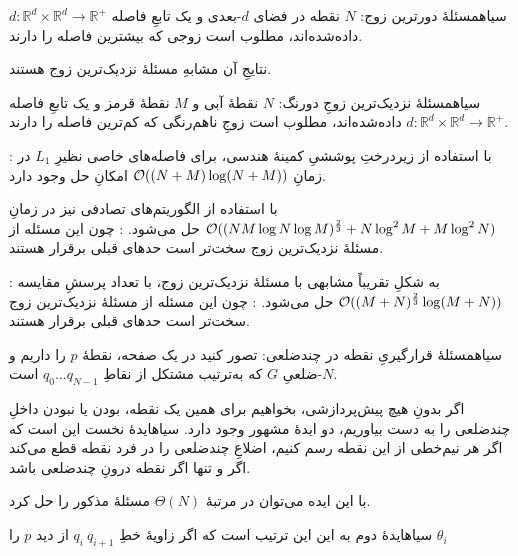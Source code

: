     ‌سیاه{مسئلهٔ دورترین زوج}: 
    \(N\)
    نقطه در فضای \(d\)-بعدی و یک تابعِ فاصله 
    \(d: \mathbb{R}^d \times \mathbb{R}^d \to \mathbb{R}^+\)
    داده‌شده‌اند، مطلوب است زوجی که بیشترین فاصله را دارند.
     
    نتایجِ آن مشابهِ مسئلهٔ نزدیک‌ترین زوج هستند.

    ‌سیاه{مسئلهٔ نزدیک‌ترین زوجِ دورنگ}: 
    $N$
    نقطهٔ آبی و $M$ نقطهٔ قرمز و یک تابعِ فاصله 
    \(d: \mathbb{R}^d \times \mathbb{R}^d \to \mathbb{R}^+\)
    داده‌شده‌اند، مطلوب است زوجِ ناهم‌رنگی که کم‌ترین فاصله را دارند. \cite[]{kao}

        : با استفاده از زیردرختِ پوششیِ کمینهٔ هندسی، برای فاصله‌های خاصی نظیرِ $L_1$ در زمانِ 
        $\mathcal{O}((N+M) \log (N+M))$
         امکانِ حل وجود دارد.

        با استفاده از الگوریتم‌های تصادفی نیز در زمانِ
        $\mathcal{O}((NM \log N\log M)^\frac{2}{3}+N\log^2M+M\log^2N)$
        حل می‌شود.
        : چون این مسئله از مسئلهٔ نزدیک‌ترین زوج سخت‌تر است حدهای قبلی برقرار هستند.

        : به شکلِ تقریباً مشابهی با مسئلهٔ نزدیک‌ترین زوج، با تعداد پرسشِ مقایسه
        $\mathcal{O}((M+N)^{\frac{2}{3}} \log (M+N))$
        حل می‌شود.
        : چون این مسئله از مسئلهٔ نزدیک‌ترین زوج سخت‌تر است حدهای قبلی برقرار هستند.




‌سیاه{مسئلهٔ قرارگیریِ نقطه در چندضلعی}: تصور کنید در یک صفحه، نقطهٔ 
\(p\)
را داریم و \(N\)-ضلعیِ 
\(G\)
که به‌ترتیب مشتکل از نقاطِ 
\(q_0 \dots q_{N-1}\)
است.

اگر بدونِ هیچ پیش‌پردازشی، بخواهیم برای همین یک نقطه، بودن یا نبودن داخلِ چندضلعی را به دست بیاوریم، دو ایدهٔ مشهور وجود دارد.
‌سیاه{ایدهٔ نخست} این است که اگر هر نیم‌خطی از این نقطه رسم کنیم، اضلاعِ چندضلعی را در فرد نقطه قطع می‌کند اگر و تنها اگر نقطه درونِ چندضلعی باشد.

با این ایده می‌توان در مرتبهٔ 
$\Theta(N)$
مسئلهٔ مذکور را حل کرد.

‌سیاه{ایدهٔ دوم} به این  این ترتیب است که اگر زاویهٔ خطِ 
\( q_i ~ q_{i+1} \)
از دید 
\( p \)
را 
\( \theta_i \)

